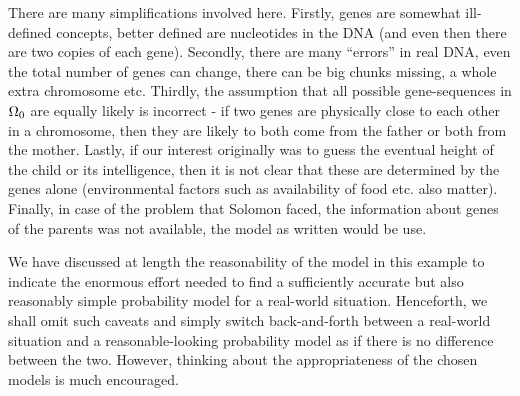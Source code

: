 \documentclass[preprint,  11pt]{amsart}
\begin{document}
 There are many simplifications involved here. Firstly, genes are somewhat ill-defined concepts, better defined are nucleotides in the DNA (and even then there are two copies of each gene). Secondly, there are many ``errors'' in real DNA, even the total number of genes can change, there can be big chunks missing, a whole extra chromosome etc. Thirdly, the assumption that all possible gene-sequences in $\Omega_{0}$ are equally likely is incorrect - if two genes are physically close to each other in a chromosome, then they are likely to both come from the father or both from the mother. Lastly, if our interest originally was to guess the eventual height of the child or its intelligence, then it is not clear that these are determined by the genes alone (environmental factors such as availability of food etc. also matter). Finally, in case of the problem that Solomon faced, the information about genes of the parents was not available, the model as written would be use. 
\eeg

\berk We have discussed at length the reasonability of the model in this example to indicate the enormous effort needed to find a sufficiently  accurate but also reasonably simple probability model for a real-world situation. Henceforth, we shall omit such caveats and simply switch back-and-forth between a real-world situation and a reasonable-looking probability model as if there is no difference between the two. However, thinking about the appropriateness of the chosen models is much encouraged. 
\eerk

\end{document}
